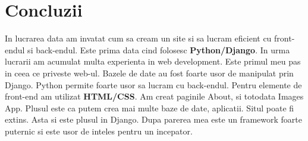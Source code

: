 \documentclass[12pt]{article}
\newcommand\tab[1][1cm]{\hspace*{#1}}
\begin{document}

\cleardoublepage


\cleardoublepage

\newpage
\section {Concluzii}
\tab In lucrarea data am invatat cum sa cream un site si sa lucram eficient
cu front-endul si back-endul. Este prima data cind folosesc \textbf{Python/Django}.
In urma lucrarii am acumulat multa experienta in web development. Este primul
meu pas in ceea ce priveste web-ul. Bazele de date au fost foarte usor de
manipulat prin Django. Python permite foarte usor sa lucram cu back-endul.
Pentru elemente de front-end am utilizat \textbf{HTML/CSS}. Am creat paginile
About, si totodata Images App. Plusul este ca putem crea mai multe baze de date, aplicatii. Situl poate fi extins. Asta si este plusul in Django. Dupa parerea
mea este un framework foarte puternic si este usor de inteles pentru un incepator.
\end{document}
